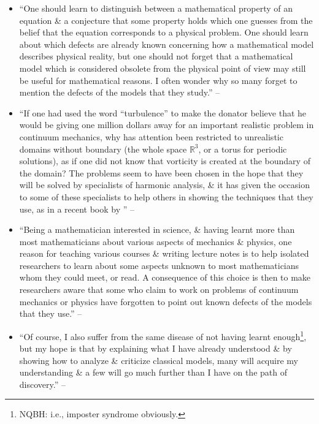 \documentclass{article}
\begin{document}
\begin{enumerate}
\begin{itemize}
		\item ``One should learn to distinguish between a mathematical property of an equation \& a conjecture that some property holds which one guesses from the belief that the equation corresponds to a physical problem. One should learn about which defects are already known concerning how a mathematical model describes physical reality, but one should not forget that a mathematical model which is considered obsolete from the physical point of view may still be useful for mathematical reasons. I often wonder why so many forget to mention the defects of the models that they study.'' -- \cite[Preface, p. vii]{Tartar2006}
		\item ``If one had used the word ``turbulence'' to make the donator believe that he would be giving one million dollars away for an important realistic problem in continuum mechanics, why has attention been restricted to unrealistic domains without boundary (the whole space $\mathbb{R}^3$, or a torus for periodic solutions), as if one did not know that vorticity is created at the boundary of the domain? The problems seem to have been chosen in the hope that they will be solved by specialists of harmonic analysis, \& it has given the occasion to some of these specialists to help others in showing the techniques that they use, as in a recent book by \cite{Lemarie-Rieusset2016}'' -- \cite[Preface, p. viii]{Tartar2006}
		\item ``Being a mathematician interested in science, \& having learnt more than most mathematicians about various aspects of mechanics \& physics, one reason for teaching various courses \& writing lecture notes is to help isolated researchers to learn about some aspects unknown to most mathematicians whom they could meet, or read. A consequence of this choice is then to make researchers aware that some who claim to work on problems of continuum mechanics or physics have forgotten to point out known defects of the models that they use.'' -- \cite[Preface, pp. viii--ix]{Tartar2006}
		\item ``Of course, I also suffer from the same disease of not having learnt enough\footnote{NQBH: i.e., imposter syndrome obviously.}, but my hope is that by explaining what I have already understood \& by showing how to analyze \& criticize classical models, many will acquire my understanding \& a few will go much further than I have on the path of discovery.'' -- \cite[Preface, p. ix]{Tartar2006}

\end{itemize}
\end{enumerate}
\end{document}
